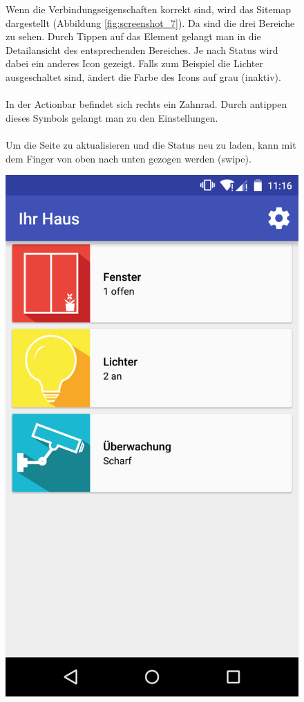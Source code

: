\begin{figure}[htbp]
	\begin{minipage}{0.6\textwidth} 
Wenn die Verbindungseigenschaften korrekt sind, wird das Sitemap dargestellt (Abbildung \ref{fig:screenshot_7}). Da sind die drei Bereiche zu sehen. Durch Tippen auf das Element gelangt man in die Detailansicht des entsprechenden Bereiches. Je nach Status wird dabei ein anderes Icon gezeigt. Falls zum Beispiel die Lichter ausgeschaltet sind, ändert die Farbe des Icons auf grau (inaktiv). \\ \\
In der Actionbar befindet sich rechts ein Zahnrad. Durch antippen dieses Symbols gelangt man zu den Einstellungen.
\\ \\
Um die Seite zu aktualisieren und die Status neu zu laden, kann mit dem Finger von oben nach unten gezogen werden (swipe).
	\end{minipage}
	\hfill
	\begin{minipage}{0.32\textwidth}
		\includegraphics[scale=0.12]{appendix/img/AppScreenshots/Screenshot7}

\end{minipage}
\end{figure}
